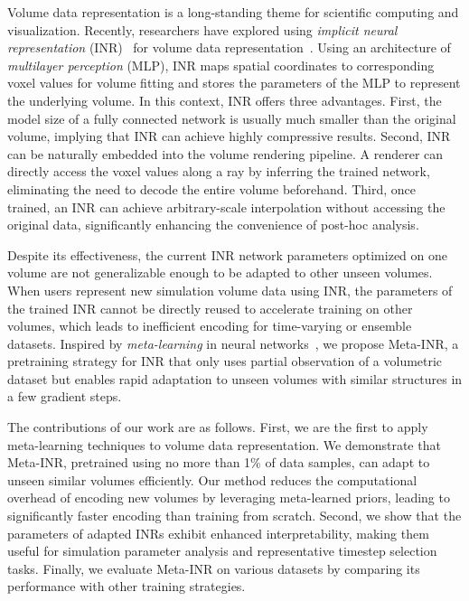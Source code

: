 Volume data representation is a long-standing theme for scientific computing and visualization. 
Recently, researchers have explored using {\em implicit neural representation} (INR)~\cite{Sitzmann-SIREN-NeurIPS20} for volume data representation~\cite{Lu-neurcomp, Han-TVCG23, Tang-CG24, Tang-PVIS24}.
Using an architecture of {\em multilayer perception} (MLP), INR maps spatial coordinates to corresponding voxel values for volume fitting and stores the parameters of the MLP to represent the underlying volume.
In this context, INR offers three advantages. 
First, the model size of a fully connected network is usually much smaller than the original volume, implying that INR can achieve highly compressive results.
Second, INR can be naturally embedded into the volume rendering pipeline. A renderer can directly access the voxel values along a ray by inferring the trained network, eliminating the need to decode the entire volume beforehand.
Third, once trained, an INR can achieve arbitrary-scale interpolation without accessing the original data, significantly enhancing the convenience of post-hoc analysis.

Despite its effectiveness, the current INR network parameters optimized on one volume are not generalizable enough to be adapted to other unseen volumes.
When users represent new simulation volume data using INR, the parameters of the trained INR cannot be directly reused to accelerate training on other volumes, which leads to inefficient encoding for time-varying or ensemble datasets.
Inspired by {\em meta-learning} in neural networks~\cite{Hospedales-TPMAI22}, we propose Meta-INR, a pretraining strategy for INR that only uses partial observation of a volumetric dataset but enables rapid adaptation to unseen volumes with similar structures in a few gradient steps. 

The contributions of our work are as follows. 
First, we are the first to apply meta-learning techniques to volume data representation. 
We demonstrate that Meta-INR, pretrained using no more than 1\% of data samples, can adapt to unseen similar volumes efficiently. 
Our method reduces the computational overhead of encoding new volumes by leveraging meta-learned priors, leading to significantly faster encoding than training from scratch. 
Second, we show that the parameters of adapted INRs exhibit enhanced interpretability, making them useful for simulation parameter analysis and representative timestep selection tasks.
Finally, we evaluate Meta-INR on various datasets by comparing its performance with other training strategies.